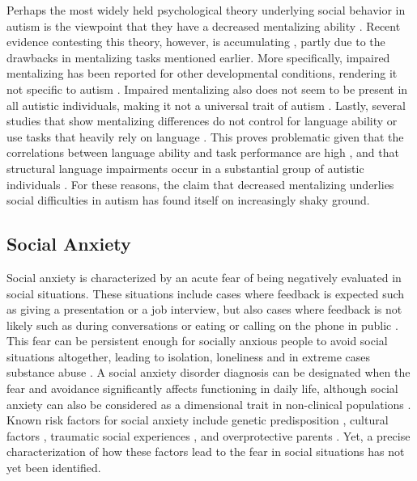 Perhaps the most widely held psychological theory underlying social behavior in autism is the viewpoint that they have a decreased mentalizing ability \citep{baron-cohen1985}. Recent evidence contesting this theory, however, is accumulating \citep{gernsbacher2019}, partly due to the drawbacks in mentalizing tasks mentioned earlier. More specifically, impaired mentalizing has been reported for other developmental conditions, rendering it not specific to autism \citep{jenkins1996,loukusa2014}. Impaired mentalizing also does not seem to be present in all autistic individuals, making it not a universal trait of autism \citep{happe1993,moessnang2020}. Lastly, several studies that show mentalizing differences do not control for language ability or use tasks that heavily rely on language \citep{gernsbacher2005}. This proves problematic given that the correlations between language ability and task performance are high \citep{capage2001,shaked2006}, and that structural language impairments occur in a substantial group of autistic individuals \citep{velikonja2019}. For these reasons, the claim that decreased mentalizing underlies social difficulties in autism has found itself on increasingly shaky ground. 

\subsection{Social Anxiety}

Social anxiety is characterized by an acute fear of being negatively evaluated in social situations. These situations include cases where feedback is expected such as giving a presentation or a job interview, but also cases where feedback is not likely such as during conversations or eating or calling on the phone in public \citep{apa2013}. This fear can be persistent enough for socially anxious people to avoid social situations altogether, leading to isolation, loneliness and in extreme cases substance abuse \citep{lemyre2019,lim2016}. A social anxiety disorder diagnosis can be designated when the fear and avoidance significantly affects functioning in daily life, although social anxiety can also be considered as a dimensional trait in non-clinical populations \citep{ruscio2010}. Known risk factors for social anxiety include genetic predisposition \citep{kendler1999}, cultural factors \citep{leung1994}, traumatic social experiences \citep{rapee2004}, and overprotective parents \citep{dulger2024,taylor2006}. Yet, a precise characterization of how these factors lead to the fear in social situations has not yet been identified. 

